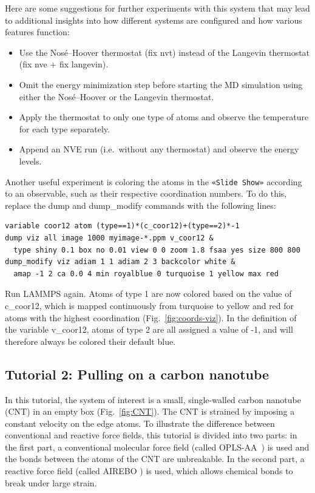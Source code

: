 \documentclass[9pt,tutorial]{livecoms}
\newcommand{\lmpcmd}[1]{\hspace{0pt}\colorbox{listing}{\textcolor{command}{\small{#1}}}\hspace{0pt}} %
\newcommand{\guicmd}[1]{\textcolor{command}{\texttt{«#1»}}} %
\begin{document}
Here are some suggestions for further experiments with this system that
may lead to additional insights into how different systems are configured
and how various features function:
\begin{itemize}
\item Use the Nos\'e--Hoover thermostat (\lmpcmd{fix nvt}) instead of the Langevin thermostat
  (\lmpcmd{fix nve} + \lmpcmd{fix langevin}).
\item Omit the energy minimization step before starting the MD simulation using either
the Nos\'e--Hoover or the Langevin thermostat.
\item Apply the thermostat to only one type of atoms and observe the
  temperature for each type separately.
\item Append an NVE run (i.e.~without any thermostat) and observe the energy levels.
\end{itemize}

Another useful experiment is coloring the atoms in the \guicmd{Slide Show}
according to an observable, such as their respective coordination
numbers.  To do this, replace the
\lmpcmd{dump} and \lmpcmd{dump\_modify} commands with the following lines:
\begin{lstlisting}
variable coor12 atom (type==1)*(c_coor12)+(type==2)*-1
dump viz all image 1000 myimage-*.ppm v_coor12 &
  type shiny 0.1 box no 0.01 view 0 0 zoom 1.8 fsaa yes size 800 800
dump_modify viz adiam 1 1 adiam 2 3 backcolor white &
  amap -1 2 ca 0.0 4 min royalblue 0 turquoise 1 yellow max red
\end{lstlisting}
Run LAMMPS again.  Atoms of type 1 are now colored based on the value
of \lmpcmd{c\_coor12}, which is mapped continuously from turquoise to yellow
and red for atoms with the highest coordination (Fig.~\ref{fig:coords-viz}).
In the definition of the variable \lmpcmd{v\_coor12}, atoms of type 2 are
all assigned a value of -1, and will therefore always be colored their default blue.

\subsection{Tutorial 2: Pulling on a carbon nanotube}
\label{carbon-nanotube-label}

In this tutorial, the system of interest is a small, single-walled
carbon nanotube (CNT) in an empty box (Fig.~\ref{fig:CNT}).  The CNT is
strained by imposing a constant velocity on the edge atoms.
To illustrate the difference between conventional and reactive force fields, this
tutorial is divided into two parts: in the first part, a conventional molecular force
field (called OPLS-AA~\cite{jorgensenDevelopmentTestingOPLS1996}) is
used and the bonds between the atoms of the CNT are unbreakable.  In the
second part, a reactive force field (called AIREBO
\cite{stuart2000reactive}) is used, which allows chemical bonds to break under large strain.
\end{document}
